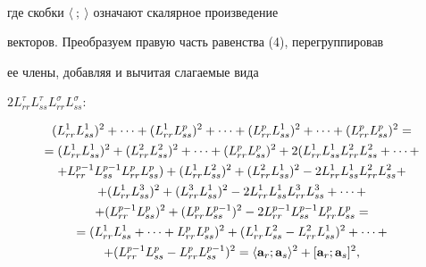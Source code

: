\begin{pf}
\begin{multline}
\end{multline}


где скобки $\langle\ ;\ \rangle$ означают скалярное произведение


векторов. Преобразуем правую часть равенства (4), перегруппировав


ее члены, добавляя и вычитая слагаемые вида


$2L_{rr}^{\tau}L_{ss}^{\tau}L_{rr}^{\sigma}L_{ss}^{\sigma}$:


\begin{multline}


(L_{rr}^{1}L_{ss}^{1})^{2}+\dotsb+(L_{rr}^{1}L_{ss}^{p})^2+\dotsb+


(L_{rr}^{p}L_{ss}^{1})^{2}+\dotsb+(L_{rr}^{p}L_{ss}^{p})^{2}=  \\


%


=(L_{rr}^{1}L_{ss}^{1})^{2}+(L_{rr}^{2}L_{ss}^{2})^{2}+\dotsb+


(L_{rr}^{p}L_{ss}^{p})^{2}+2(L_{rr}^{1}L_{ss}^{1}L_{rr}^{2}L_{ss}^{2}+\dotsb+\\


%


+L_{rr}^{p-1}L_{ss}^{p-1}L_{rr}^{p}L_{ss}^{p})+(L_{rr}^{1}L_{ss}^{2})^{2}+


(L_{rr}^{2}L_{ss}^{1})^{2}-2L_{rr}^{1}L_{ss}^{1}L_{rr}^{2}L_{ss}^{2}+ \\


%


+(L_{rr}^{1}L_{ss}^{3})^{2}+(L_{rr}^{3}L_{ss}^{1})^{2}


-2L_{rr}^{1}L_{ss}^{1}L_{rr}^{3}L_{ss}^{3}+\dotsb+ \\


%


+(L_{rr}^{p-1}L_{ss}^{p})^{2}+(L_{rr}^{p}L_{ss}^{p-1})^{2}


-2L_{rr}^{p-1}L_{ss}^{p-1}L_{rr}^{p}L_{ss}^{p}= \\


%


=(L_{rr}^{1}L_{ss}^{1}+\dotsb+L_{rr}^{p}L_{ss}^{p})^{2}+


(L_{rr}^{1}L_{ss}^{2}-L_{rr}^{2}L_{ss}^{1})^{2}+\dotsb+ \\


%


+(L_{rr}^{p-1}L_{ss}^{p}-L_{rr}^{p} L_{ss}^{p-1})^{2}=  \langle


\bold a_{r};\bold a_{s}\rangle^{2}+[\bold a_{r};\bold a_{s}]^{2},


\end{multline}



\end{pf}

